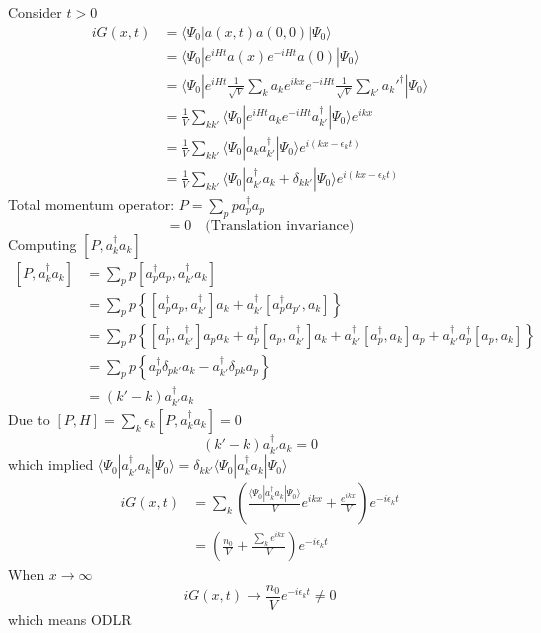 \documentclass[a4paper,11pt]{article}
\begin{document}
Consider $t>0$
\begin{equation*}
  \begin{split}
     iG(x,t)&=\langle\Psi_0|a(x,t)a(0,0)|\Psi_0\rangle\\
       &=\langle\Psi_0|e^{iHt}a(x)e^{-iHt}a(0)|\Psi_0\rangle\\
       &=\langle\Psi_0|e^{iHt}\frac{1}{\sqrt{V}}\sum_{k}a_ke^{ikx}e^{-iHt}\frac{1}{\sqrt{V}}\sum_{k'}a_k'^\dag|\Psi_0\rangle\\
       &=\frac{1}{V}\sum_{kk'}\langle\Psi_0|e^{iHt}a_ke^{-iHt}a_{k'}^\dag|\Psi_0\rangle e^{ikx}\\
       &=\frac{1}{V}\sum_{kk'}\langle\Psi_0|a_ka_{k'}^\dag|\Psi_0\rangle e^{i(kx-\epsilon_k t)}\\
       &=\frac{1}{V}\sum_{kk'}\langle\Psi_0|a_{k'}^\dag a_k+\delta_{kk'}|\Psi_0\rangle e^{i(kx-\epsilon_k t)}
  \end{split}
\end{equation*}
Total momentum operator: $P=\sum_{p}pa_p^\dag a_p$
\begin{equation*}
  [P,H]=0\quad\text{(Translation invariance)}
\end{equation*}
Computing $[P,a_k^\dag a_k]$
\begin{equation*}
  \begin{split}
     [P,a_k^\dag a_k]&=\sum_{p}p[a_p^\dag a_p,a_{k'}^\dag a_k]\\
       &=\sum_{p}p\left\{[a_p^\dag a_p,a_{k'}^\dag]a_k+a_{k'}^\dag[a_p^\dag a_{p'},a_k]\right\}\\
       &=\sum_{p}p\left\{[a_p^\dag,a_{k'}^\dag]a_p a_k+a_p^\dag[a_p,a_{k'}^\dag]a_k+a_{k'}^\dag[a_p^\dag,a_k]a_p+a_{k'}^\dag a_p^\dag[a_p,a_k]\right\}\\
       &=\sum_{p}p\left\{a_p^\dag\delta_{pk'}a_k-a_{k'}^\dag\delta_{pk}a_p\right\}\\
       &=(k'-k)a_{k'}^\dag a_k
  \end{split}
\end{equation*}
Due to $[P,H]=\sum_{k}\epsilon_k[P,a_k^\dag a_k]=0$
\begin{equation*}
  (k'-k)a_{k'}^\dag a_k=0
\end{equation*}
which implied $\langle\Psi_0|a_{k'}^\dag a_k|\Psi_0\rangle=\delta_{kk'}\langle\Psi_0|a_k^\dag a_k|\Psi_0\rangle$
\begin{equation*}
  \begin{split}
     iG(x,t)&=\sum_{k}\left(\frac{\langle\Psi_0|a_k^\dag a_k|\Psi_0\rangle}{V}e^{ikx}+\frac{e^{ikx}}{V}\right)e^{-i\epsilon_k t}\\
       &=\left(\frac{n_0}{V}+\frac{\sum_{k}e^{ikx}}{V}\right)e^{-i\epsilon_k t}
  \end{split}
\end{equation*}
When $x\to\infty$
\begin{equation*}
  iG(x,t)\to\frac{n_0}{V}e^{-i\epsilon_k t}\neq0
\end{equation*}
which means ODLR
\end{document}

